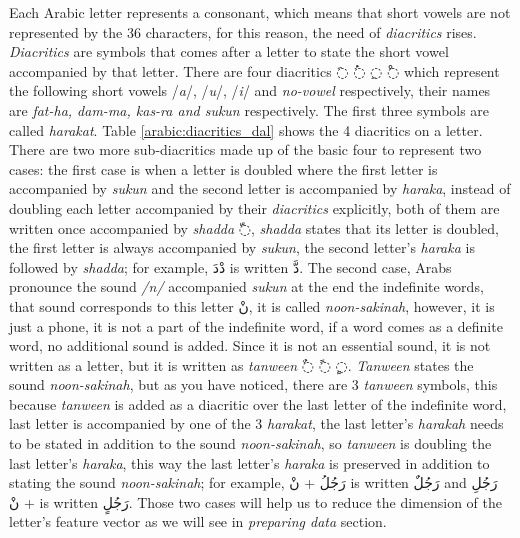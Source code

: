 \documentclass[12pt]{report}
\begin{document}
Each Arabic letter represents a consonant, which means that short vowels are not
represented by the 36 characters, for this reason, the need of \textit{diacritics}
rises. \textit{Diacritics} are symbols that comes after a letter to state the
short vowel accompanied by that letter. There are four diacritics \textarabic{◌َ} \textarabic{◌ُ}
\textarabic{◌ِ} \textarabic{◌ْ} which represent the following short vowels
/\textit{a}/, /\textit{u}/, /\textit{i}/ and \textit{no-vowel} respectively,
their names are \textit{fat-ha, dam-ma, kas-ra and sukun} respectively.  The first
three symbols are called \textit{harakat}. Table \ref{arabic:diacritics_dal}
shows the 4 diacritics on a letter. 
%
There are two more sub-diacritics made up of the basic four to represent two
cases: the first case is when a letter is doubled where the first letter is
accompanied by \textit{sukun} and the second letter is accompanied by
\textit{haraka}, instead of doubling each letter accompanied by their
\textit{diacritics} explicitly, both of them are written once accompanied by
\textit{shadda} \textarabic{◌ّ}, \textit{shadda} states that its letter is
doubled, the first letter is always accompanied by \textit{sukun}, the second
letter's \textit{haraka} is followed by \textit{shadda}; for example,
\textarabic{دْدَ} is written \textarabic{دَّ}.
The second case, Arabs pronounce the sound \textit{/n/} accompanied
\textit{sukun} at the end the indefinite words, that sound corresponds to this
letter \textarabic{نْ}, it is called \textit{noon-sakinah}, however, it is
just a phone, it is not a part of the indefinite word, if a word comes as a
definite word, no additional sound is added. Since it is not an essential sound,
it is not written as a letter, but it is written as  \textit{tanween}
\textarabic{◌ٌ ◌ً ◌ٍ}. 
\textit{Tanween} states the sound \textit{noon-sakinah}, but as you have noticed,
there are 3 \textit{tanween} symbols, this because  \textit{tanween} is added as
a diacritic over the last letter of the indefinite word, last letter is
accompanied by one of the 3 \textit{harakat}, the last letter's \textit{harakah}
needs to be stated in addition to the sound \textit{noon-sakinah}, so
\textit{tanween} is doubling the last letter's \textit{haraka}, this way the last
letter's \textit{haraka} is preserved in addition to stating the sound
\textit{noon-sakinah}; for example, \textarabic{رَجُلُ + نْ} is written
\textarabic{رَجُلٌ} and  \textarabic{رَجُلِ + نْ} is written \textarabic{رَجُلٍ}.
%
Those two cases will help us to reduce the dimension of the letter's feature vector as we
will see in \textit{preparing data} section.
\end{document}
